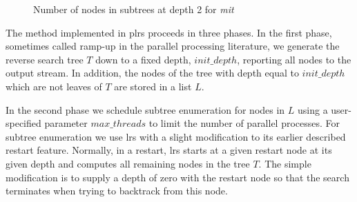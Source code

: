 \documentclass[a4paper,11pt]{article}   \usepackage{authblk} \usepackage[top=1.9cm,bottom=1.9cm,left=1.9cm,right=1.9cm]{geometry}
\newcommand{\progname}{\textsf}
\newcommand{\lrs}{\progname{lrs}\xspace}
\newcommand{\plrs}{\progname{plrs}\xspace}
\newcommand{\polytope}{\emph}
\newcommand{\mitine}{\polytope{mit}\xspace}
\newcommand{\initdepth}{\ensuremath{\mathit{init\_depth}}\xspace}
\newcommand{\maxthreads}{\ensuremath{\mathit{max\_threads}}\xspace}
\begin{document}
\begin{figure}[htbp]
\centering
{}
\caption{Number of nodes in subtrees at depth 2 for \mitine}
\label{fig:mitfig}
\end{figure}
The method implemented in \plrs proceeds in three phases. 
In the first phase, sometimes called ramp-up in the parallel processing literature,
we generate the reverse search tree $T$ down to a fixed
depth, \initdepth, reporting all nodes to the output stream. In addition, the nodes of the tree 
with depth equal to  \initdepth which are not leaves of $T$
are stored in a list $L$. 

In the second phase we schedule subtree enumeration for nodes in $L$
using a user-specified parameter \maxthreads to limit the number of parallel processes. 
For subtree enumeration we use \lrs with a slight
modification to its earlier described restart feature.
Normally, in a restart, \lrs starts at a given restart node at its given 
depth and computes all remaining nodes in the tree $T$.
The simple modification is to supply a depth of zero with the restart node so that the search
terminates when trying to backtrack from this node. 
\end{document}
